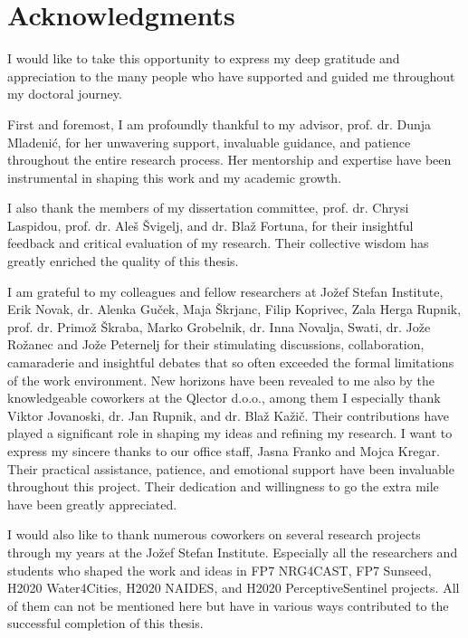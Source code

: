 % 
\chapter*{Acknowledgments}

I would like to take this opportunity to express my deep gratitude and appreciation to the many people who have supported and guided me throughout my doctoral journey.

First and foremost, I am profoundly thankful to my advisor, prof. dr. Dunja Mladenić, for her unwavering support, invaluable guidance, and patience throughout the entire research process. 
Her mentorship and expertise have been instrumental in shaping this work and my academic growth.

I also thank the members of my dissertation committee, prof. dr. Chrysi Laspidou, prof. dr. Aleš Švigelj, and dr. Blaž Fortuna, for their insightful feedback and critical evaluation of my research.
Their collective wisdom has greatly enriched the quality of this thesis.

I am grateful to my colleagues and fellow researchers at Jožef Stefan Institute, Erik Novak, dr. Alenka Guček, Maja Škrjanc, Filip Koprivec, Zala Herga Rupnik, prof. dr. Primož Škraba, Marko Grobelnik, dr. Inna Novalja, Swati, dr. Jože Rožanec and Jože Peternelj for their stimulating discussions, collaboration, camaraderie and insightful debates that so often exceeded the formal limitations of the work environment.
New horizons have been revealed to me also by the knowledgeable coworkers at the Qlector d.o.o., among them I especially thank Viktor Jovanoski, dr. Jan Rupnik, and dr. Blaž Kažič.
Their contributions have played a significant role in shaping my ideas and refining my research.
I want to express my sincere thanks to our office staff, Jasna Franko and Mojca Kregar.
Their practical assistance, patience, and emotional support have been invaluable throughout this project.
Their dedication and willingness to go the extra mile have been greatly appreciated.

I would also like to thank numerous coworkers on several research projects through my years at the Jožef Stefan Institute. 
Especially all the researchers and students who shaped the work and ideas in FP7 NRG4CAST, FP7 Sunseed, H2020 Water4Cities, H2020 NAIDES, and H2020 PerceptiveSentinel projects.
All of them can not be mentioned here but have in various ways contributed to the successful completion of this thesis. 


